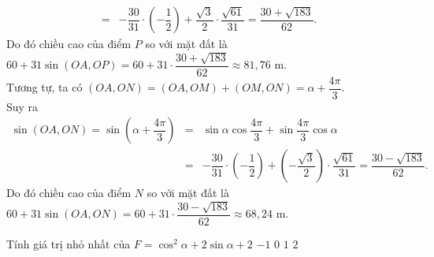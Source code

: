 \begin{bt}
{\begin{itemize}
\begin{eqnarray*}
				&=&-\dfrac{30}{31}\cdot \left(-\dfrac{1}{2}\right)+\dfrac{\sqrt{3}}{2}\cdot\dfrac{\sqrt{61}}{31}=\dfrac{30+\sqrt{183}}{62}.
			\end{eqnarray*}
			Do đó chiều cao của điểm $P$ so với mặt đất là $60+31\sin(OA,OP)=60+31\cdot \dfrac{30+\sqrt{183}}{62}\approx 81{,}76$ m.\\
			Tương tự, ta có $(OA, ON)=(OA,OM)+(OM,ON)=\alpha+\dfrac{4\pi}{3}$. \\
			Suy ra \begin{eqnarray*}
				\sin (OA,ON)=\sin\left(\alpha+\dfrac{4\pi}{3}\right)&=&\sin\alpha\cos\dfrac{4\pi}{3}+\sin\dfrac{4\pi}{3}\cos\alpha\\
				&=&-\dfrac{30}{31}\cdot \left(-\dfrac{1}{2}\right)+\left(-\dfrac{\sqrt{3}}{2}\right) \cdot\dfrac{\sqrt{61}}{31}=\dfrac{30-\sqrt{183}}{62}.
			\end{eqnarray*}
			Do đó chiều cao của điểm $N$ so với mặt đất là $60+31\sin(OA,ON)=60+31\cdot \dfrac{30-\sqrt{183}}{62}\approx 68{,}24$ m.
		\end{itemize}
	} 
\end{bt}

\begin{ex}%
	Tính giá trị nhỏ nhất của $F=\cos ^2\alpha+2\sin  \alpha+2$
	 \choice
		{$-1$} 
		{\True  $0$}
		{$1$} 
		{$2$} 
\end{ex}

